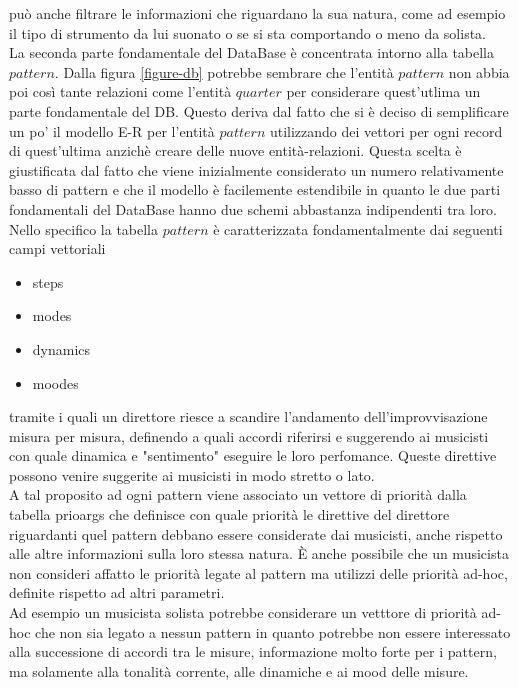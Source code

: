 può anche filtrare le informazioni che riguardano la sua natura, come ad esempio 
il tipo di strumento da lui suonato o se si sta comportando o meno da solista.\\
La seconda parte fondamentale del DataBase è concentrata intorno alla tabella $pattern$.
Dalla figura \ref{figure-db} potrebbe sembrare che l'entità $pattern$ non abbia poi 
così tante relazioni come l'entità $quarter$ per considerare quest'utlima un parte
fondamentale del DB. Questo deriva dal fatto che si è deciso di semplificare un po'
il modello E-R per l'entità $pattern$ utilizzando dei vettori per ogni record di 
quest'ultima anzichè creare delle nuove entità-relazioni. Questa scelta è giustificata
dal fatto che viene inizialmente considerato un numero relativamente basso di pattern
e che il modello è facilemente estendibile in quanto le due parti fondamentali del 
DataBase hanno due schemi abbastanza indipendenti tra loro.\\
Nello specifico la tabella $pattern$ è caratterizzata fondamentalmente dai 
seguenti campi vettoriali
\begin{itemize}
\item steps 
\item modes 
\item dynamics
\item moodes
\end{itemize}
tramite i quali un direttore riesce a scandire l'andamento dell'improvvisazione 
misura per misura, definendo a quali accordi riferirsi e suggerendo ai musicisti 
con quale dinamica e "sentimento" eseguire le loro perfomance. Queste direttive
possono venire suggerite ai musicisti in modo stretto o lato.\\
A tal proposito ad ogni pattern viene associato un vettore di priorità dalla tabella 
prioargs che definisce con quale priorità le direttive del direttore riguardanti quel 
pattern debbano essere considerate dai musicisti, anche rispetto alle altre 
informazioni sulla loro stessa natura. È anche possibile che un musicista non consideri
affatto le priorità legate al pattern ma utilizzi delle priorità ad-hoc, definite 
rispetto ad altri parametri.\\
Ad esempio un musicista solista potrebbe considerare un vetttore di priorità 
ad-hoc che non sia legato a nessun pattern in quanto 
potrebbe non essere interessato alla successione di accordi tra le misure, 
informazione molto forte per i pattern, ma solamente alla tonalità corrente, 
alle dinamiche e ai mood delle misure.\\
